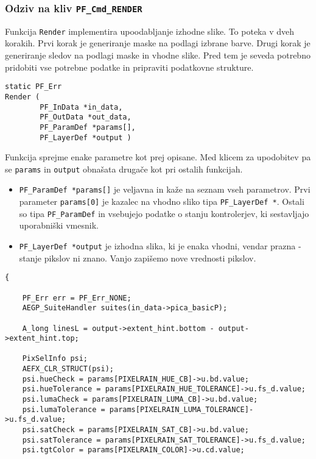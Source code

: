 \documentclass[a4paper, 12pt]{book}
\begin{document}
\subsubsection{Odziv na kliv \texttt{PF\_Cmd\_RENDER}}

Funkcija \texttt{Render} implementira upoodabljanje izhodne slike.
To poteka v dveh korakih.
Prvi korak je generiranje maske na podlagi izbrane barve.
Drugi korak je generiranje sledov na podlagi maske in vhodne slike.
Pred tem je seveda potrebno pridobiti vse potrebne podatke in pripraviti podatkovne strukture.

\begin{verbatim}
static PF_Err 
Render (
        PF_InData *in_data,
        PF_OutData *out_data,
        PF_ParamDef *params[],
        PF_LayerDef *output )
\end{verbatim}

Funkcija sprejme enake parametre kot prej opisane.
Med klicem za upodobitev pa se \texttt{params} in \texttt{output} obnašata drugače kot pri ostalih funkcijah.
\begin{itemize}
\item{\texttt{PF\_ParamDef *params[]} je veljavna in kaže na seznam vseh parametrov. 
	Prvi parameter \texttt{params[0]} je kazalec na vhodno sliko tipa \texttt{PF\_LayerDef *}.
	Ostali so tipa \texttt{PF\_ParamDef} in vsebujejo podatke o stanju kontrolerjev, ki sestavljajo uporabniški vmesnik.}
\item{\texttt{PF\_LayerDef *output} je izhodna slika, ki je enaka vhodni, vendar prazna - stanje pikslov ni znano. 
	Vanjo zapišemo nove vrednosti pikslov.  }
\end{itemize}

\begin{verbatim}
{

	PF_Err err = PF_Err_NONE;
	AEGP_SuiteHandler suites(in_data->pica_basicP);

	A_long linesL = output->extent_hint.bottom - output->extent_hint.top;
	
	PixSelInfo psi;
	AEFX_CLR_STRUCT(psi);
	psi.hueCheck = params[PIXELRAIN_HUE_CB]->u.bd.value;
	psi.hueTolerance = params[PIXELRAIN_HUE_TOLERANCE]->u.fs_d.value;
	psi.lumaCheck = params[PIXELRAIN_LUMA_CB]->u.bd.value;
	psi.lumaTolerance = params[PIXELRAIN_LUMA_TOLERANCE]->u.fs_d.value;
	psi.satCheck = params[PIXELRAIN_SAT_CB]->u.bd.value;
	psi.satTolerance = params[PIXELRAIN_SAT_TOLERANCE]->u.fs_d.value;
	psi.tgtColor = params[PIXELRAIN_COLOR]->u.cd.value;
\end{verbatim}
\end{document}
